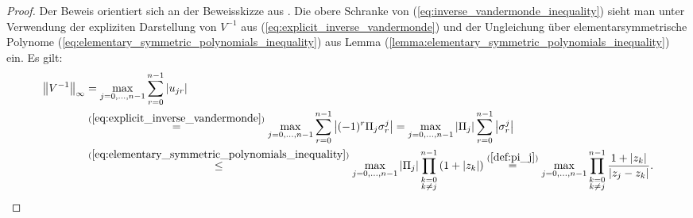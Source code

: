 \begin{proof}
    Der Beweis orientiert sich an der Beweisskizze aus
    \cite[S. 196-197]{gautschi1}.
    Die obere Schranke von (\ref{eq:inverse_vandermonde_inequality}) sieht man
    unter Verwendung der expliziten Darstellung von $V^{-1}$ aus
    (\ref{eq:explicit_inverse_vandermonde}) und der Ungleichung über
    elementarsymmetrische Polynome
    (\ref{eq:elementary_symmetric_polynomials_inequality}) aus Lemma
    (\ref{lemma:elementary_symmetric_polynomials_inequality}) ein.
    Es gilt:
    \begin{equation*}
        \begin{split}
            \left\lVert V^{-1} \right\rVert_{\infty}
            &= \max_{j=0, \dots, n-1} \sum_{r=0}^{n-1} \left\lvert u_{jr} \right\rvert\\
            &\overset{(\ref{eq:explicit_inverse_vandermonde})}{=}
              \max_{j=0, \dots, n-1} \sum_{r=0}^{n-1} \left\lvert (-1)^{r} \Pi_j \sigma_{r}^{j} \right\rvert
            = \max_{j=0, \dots, n-1} \left\lvert \Pi_j \right\rvert \sum_{r=0}^{n-1} \left\lvert \sigma_{r}^{j} \right\rvert\\
            &\overset{(\ref{eq:elementary_symmetric_polynomials_inequality})}{\leq}
              \max_{j=0, \dots, n-1} \left\lvert \Pi_j \right\rvert \prod_{\substack{k=0\\ k \neq j}}^{n-1} \left( 1 + \left\lvert z_k \right\rvert \right)
            \overset{(\ref{def:pi_j})}{=}
              \max_{j=0, \dots, n-1} \prod_{\substack{k=0\\ k \neq j}}^{n-1} \frac{1 + \left\lvert z_k \right\rvert}{\left\lvert z_j - z_k \right\rvert}.
        \end{split}
    \end{equation*}


\end{proof}
